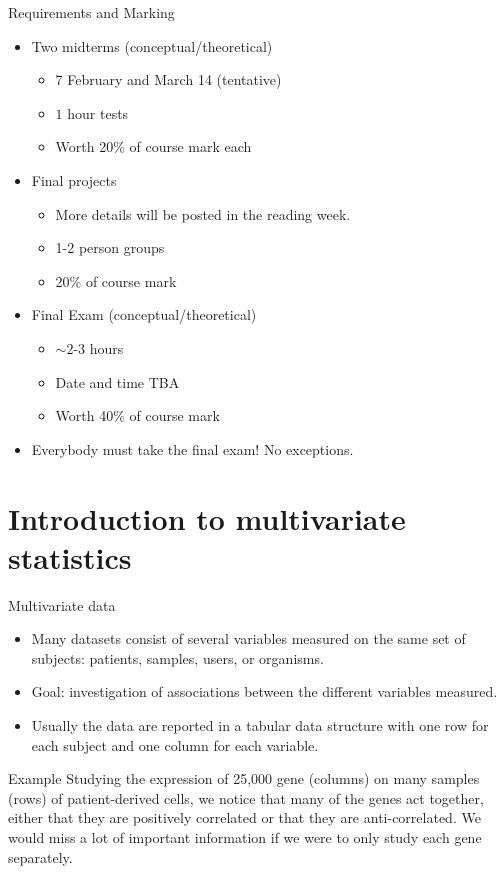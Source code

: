 \documentclass[11pt,handout,aspectratio=169]{beamer}
\begin{document}
\begin{frame}{Requirements and Marking}
\begin{itemize}
  \item Two midterms (conceptual/theoretical)
    \begin{itemize}
    \item 7 February and March 14 (tentative)
    \item $1$ hour tests 
    \item Worth 20\% of course mark each
    \end{itemize}
  \item Final projects
  \begin{itemize}
  	\item More details will be posted in the reading week.
  	\item 1-2 person groups
  	\item 20\% of course mark
  \end{itemize}
  \item Final Exam (conceptual/theoretical)
    \begin{itemize}
    \item $\sim 2$-$3$ hours
    \item Date and time TBA
    \item Worth 40\% of course mark
    \end{itemize}
    \item \alert{Everybody must take the final exam! No exceptions.}
  \end{itemize}
\end{frame}


\section{Introduction to multivariate statistics}

\begin{frame}{Multivariate data}
	\begin{itemize}
		\item Many datasets consist of several variables measured on the same set of subjects: patients, samples, users, or organisms.
		\item Goal: investigation of associations between the different variables measured.
		\item Usually the data are reported in a tabular data structure with one row for each subject and one column for each variable.  
	\end{itemize}
	\begin{exampleblock}{Example}
	Studying the expression of 25{,}000 gene (columns) on many samples (rows) of patient-derived cells, we notice that many of the genes act together, either that they are positively correlated or that they are anti-correlated. We would miss a lot of important information if we were to only study each gene separately.	
	\end{exampleblock}
\end{frame}
\end{document}
